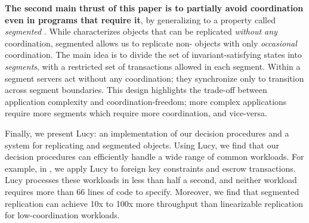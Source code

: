 \textbf{The second main thrust of this paper is to partially avoid coordination
even in programs that require it}, by generalizing \invariantconfluence{} to a
property called \emph{segmented \invariantconfluence{}}. While
\invariantconfluence{} characterizes objects that can be replicated
\emph{without any} coordination, segmented \invariantconfluence{} allows us to
replicate non-\invariantconfluent{} objects with only \emph{occasional}
coordination. The main idea is to divide the set of invariant-satisfying states
into \emph{segments}, with a restricted set of transactions allowed in each
segment.  Within a segment servers act without any coordination; they
synchronize only to transition across segment boundaries. This design
highlights the trade-off between application complexity and
coordination-freedom; more complex applications require more segments which
require more coordination, and vice-versa.

Finally, we present Lucy: an implementation of our decision procedures and a
system for replicating \invariantconfluent{} and segmented
\invariantconfluent{} objects. Using Lucy, we find that our decision procedures
can efficiently handle a wide range of common workloads.  For example, in
, we apply Lucy to foreign key constraints and escrow
transactions. Lucy processes these workloads in less than half a second, and
neither workload requires more than 66 lines of code to specify. Moreover, we
find that segmented \invariantconfluent{} replication can achieve 10x to 100x
more throughput than linearizable replication for low-coordination workloads.

